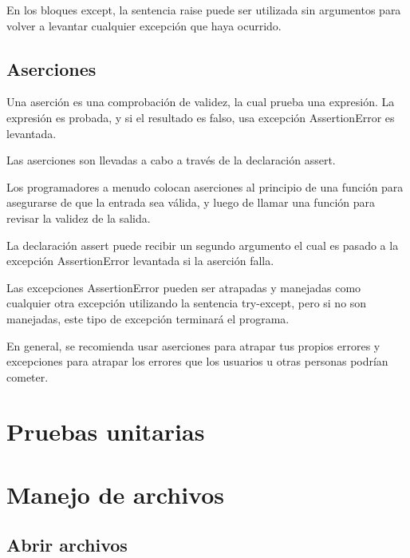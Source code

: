 \documentclass{report}
\begin{document}


En los bloques except, la sentencia raise puede ser utilizada sin argumentos para volver a levantar cualquier excepción que haya ocurrido.


\section{Aserciones}

Una aserción es una comprobación de validez, la cual prueba una expresión. La expresión es probada, y si el resultado es falso, usa excepción AssertionError es levantada.

Las aserciones son llevadas a cabo a través de la declaración assert.


Los programadores a menudo colocan aserciones al principio de una función para asegurarse de que la entrada sea válida, y luego de llamar una función para revisar la validez de la salida.

La declaración assert puede recibir un segundo argumento el cual es pasado a la excepción AssertionError levantada si la aserción falla.


Las excepciones AssertionError pueden ser atrapadas y manejadas como cualquier otra excepción utilizando la sentencia try-except, pero si no son manejadas, este tipo de excepción terminará el programa.

En general, se recomienda usar aserciones para atrapar tus propios errores y excepciones para atrapar los errores que los usuarios u otras personas podrían cometer.


\clearpage\chapter{Pruebas unitarias}

\clearpage\chapter{Manejo de archivos}

\section{Abrir archivos}
\end{document}
